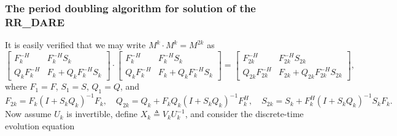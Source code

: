 \begin{figure*}[t]

\end{figure*}

\subsubsection{The period doubling algorithm for solution of the RR_DARE}\label{subsec:Ddoubling}

It is easily verified that we may write $M^k\cdot M^k = M^{2k}$ as
\begin{equation}
\label{eq:idenperdub}
\begin{bmatrix}  F_k^{-H} & F_k^{-H}S_k \\ Q_k F_k^{-H} & F_k+ Q_k F_k^{-H}S_k  \end{bmatrix} \cdot \begin{bmatrix} F_k^{-H} & F_k^{-H}S_k \\ Q_k F_k^{-H} & F_k+ Q_k F_k^{-H}S_k  \end{bmatrix} =
\begin{bmatrix} F_{2k}^{-H} & F_{2k}^{-H}S_{2k} \\ Q_{2k} F_{2k}^{-H} & F_{2k}+ Q_{2k} F_{2k}^{-H}S_{2k} \end{bmatrix},
\end{equation}
where $F_1=F$, $S_1=S$, $Q_1=Q$, and
\begin{equation}
F_{2k} = F_k (I+ S_k Q_k)^{-1} F_k, \quad Q_{2k} = Q_k + F_k Q_k (I+S_k Q_k)^{-1} F^H_k, \quad S_{2k} = S_k + F^H_k (I+S_k Q_k)^{-1}  S_k F_k.
\label{eq:perdubiter}
\end{equation}
Now assume $U_k$ is invertible, define $X_k \triangleq V_k U_k^{-1}$, and consider the discrete-time evolution equation
